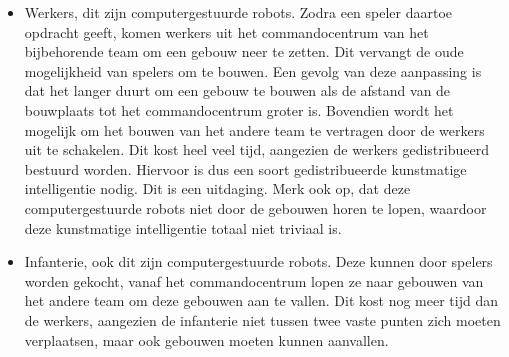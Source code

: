 \begin{itemize}
  \item Werkers, dit zijn computergestuurde robots. Zodra een speler daartoe opdracht geeft, komen werkers uit het commandocentrum van het bijbehorende team om een gebouw neer te zetten. Dit vervangt de oude mogelijkheid van spelers om te bouwen. Een gevolg van deze aanpassing is dat het langer duurt om een gebouw te bouwen als de afstand van de bouwplaats tot het commandocentrum groter is. Bovendien wordt het mogelijk om het bouwen van het andere team te vertragen door de werkers uit te schakelen. Dit kost heel veel tijd, aangezien de werkers gedistribueerd bestuurd worden. Hiervoor is dus een soort gedistribueerde kunstmatige intelligentie nodig. Dit is een uitdaging. Merk ook op, dat deze computergestuurde robots niet door de gebouwen horen te lopen, waardoor deze kunstmatige intelligentie totaal niet triviaal is.
  \item Infanterie, ook dit zijn computergestuurde robots. Deze kunnen door spelers worden gekocht, vanaf het commandocentrum lopen ze naar gebouwen van het andere team om deze gebouwen aan te vallen. Dit kost nog meer tijd dan de werkers, aangezien de infanterie niet tussen twee vaste punten zich moeten verplaatsen, maar ook gebouwen moeten kunnen aanvallen.
\end{itemize} 